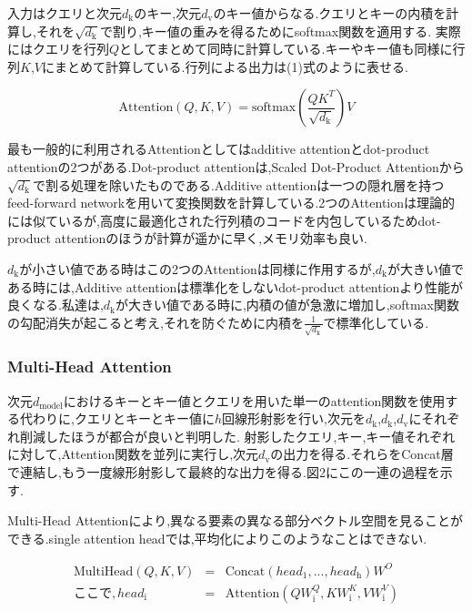 \documentclass[twocolumn]{jarticle}     %
\begin{document}
入力はクエリと次元$d_\mathrm{k}$のキー,次元$d_\mathrm{v}$のキー値からなる.クエリとキーの内積を計算し,それを$\sqrt{d_\mathrm{k}}$で割り,キー値の重みを得るためにsoftmax関数を適用する.
実際にはクエリを行列$Q$としてまとめて同時に計算している.キーやキー値も同様に行列$K$,$V$にまとめて計算している.行列による出力は(1)式のように表せる.

\begin{equation}
  \mathrm{Attention}(Q,K,V) = \mathrm{softmax}(\frac{QK^T}{\sqrt{d_\mathrm{k}}})V
\end{equation}

\par

最も一般的に利用されるAttentionとしてはadditive attentionとdot-product attentionの2つがある.Dot-product attentionは,Scaled Dot-Product Attentionから$\sqrt{d_\mathrm{k}}$で割る処理を除いたものである.Additive attentionは一つの隠れ層を持つfeed-forward networkを用いて変換関数を計算している.2つのAttentionは理論的には似ているが,高度に最適化された行列積のコードを内包しているためdot-product attentionのほうが計算が遥かに早く,メモリ効率も良い.\par
$d_\mathrm{k}$が小さい値である時はこの2つのAttentionは同様に作用するが,$d_\mathrm{k}$が大きい値である時には,Additive attentionは標準化をしないdot-product attentionより性能が良くなる.私達は,$d_\mathrm{k}$が大きい値である時に,内積の値が急激に増加し,softmax関数の勾配消失が起こると考え,それを防ぐために内積を$\frac{1}{\sqrt{d_\mathrm{k}}}$で標準化している.

\subsubsection{Multi-Head Attention}
次元$d_\mathrm{model}$におけるキーとキー値とクエリを用いた単一のattention関数を使用する代わりに,クエリとキーとキー値に$h$回線形射影を行い,次元を$d_\mathrm{k}$,$d_\mathrm{k}$,$d_\mathrm{v}$にそれぞれ削減したほうが都合が良いと判明した.
射影したクエリ,キー,キー値それぞれに対して,Attention関数を並列に実行し,次元$d_\mathrm{v}$の出力を得る.それらをConcat層で連結し,もう一度線形射影して最終的な出力を得る.図2にこの一連の過程を示す.
\par
Multi-Head Attentionにより,異なる要素の異なる部分ベクトル空間を見ることができる.single attention headでは,平均化によりこのようなことはできない.
\par
\begin{eqnarray*}
  \mathrm{MultiHead}(Q,K,V)&  = & \mathrm{Concat}(head_\mathrm{1},...,head_\mathrm{h})W^O   \\
  ここで, head_\mathrm{i} & = & \mathrm{Attention}(QW_\mathrm{i}^Q,KW_\mathrm{i}^K,VW_\mathrm{i}^V)
\end{eqnarray*}
\end{document}
